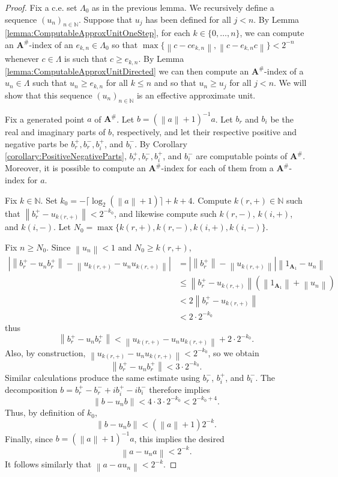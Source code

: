 \documentclass[10pt,a4paper]{amsart}
\newcommand{\abs}[1]{\left\vert #1 \right\vert}
\newcommand{\boldA}{\mathbf{A}}
\newcommand{\norm}[1]{\left\| #1 \right\|}
\begin{document}
\begin{proof}
Fix a c.e. set $\Lambda_0$ as in the previous lemma.  We recursively define a sequence $(u_n)_{n\in\mathbb{N}}$.  Suppose that $u_j$ has been defined for all $j < n$.  By Lemma \ref{lemma:ComputableApproxUnitOneStep}, for each $k \in \{0, \ldots, n\}$, we can compute an $\boldA^\#$-index of an $e_{k,n} \in \Lambda_0$ so that $\max\{\norm{c-ce_{k,n}}, \norm{c-e_{k,n}c}\} < 2^{-n}$ whenever $c \in \Lambda$ is such that $c \geq e_{k,n}$.  By Lemma \ref{lemma:ComputableApproxUnitDirected} we can then compute an $\boldA^\#$-index of a $u_n \in \Lambda$ such that $u_n \geq e_{k, n}$ for all $k \leq n$ and so that $u_n \geq u_j$ for all $j < n$.  We will show that this sequence $(u_n)_{n\in\mathbb{N}}$ is an effective approximate unit.

Fix a generated point $a$ of $\boldA^\#$.  Let $b = (\norm{a}+1)^{-1}a$.  Let $b_r$ and $b_i$ be the real and imaginary parts of $b$, respectively, and let their respective positive and negative parts be $b_r^+, b_r^-, b_i^+$, and $b_i^-$.  By Corollary \ref{corollary:PositiveNegativeParts}, $b_r^+, b_r^-, b_i^+$, and $b_i^-$ are computable points of $\boldA^\#$.  Moreover, it is possible to compute an $\boldA^\#$-index for each of them from a $\boldA^\#$-index for $a$.

Fix $k \in \mathbb{N}$.  Set $k_0 = -\lceil \log_2(\norm{a} + 1) \rceil + k + 4$.  Compute $k(r, +) \in \mathbb{N}$ such that $\norm{b_r^+-u_{k(r,+)}} < 2^{-k_0}$, and likewise compute such $k(r, -)$, $k(i, +)$, and $k(i, -)$.  Let $N_0 = \max\{k(r,+), k(r,-), k(i,+), k(i, -)\}$.

Fix $n \geq N_0$.  Since $\norm{u_n} < 1$ and $N_0 \geq k(r,+)$,
\begin{align*}
\abs{\norm{b_r^+ - u_n b_r^+} - \norm{u_{k(r,+)} - u_n u_{k(r,+)}}}
&= \abs{\norm{b_r^+} - \norm{u_{k(r,+)}}}\norm{1_{\boldA_1}-u_n} \\ &\leq \norm{b_r^+-u_{k(r,+)}}(\norm{1_{\boldA_1}}+\norm{u_n}) \\
&< 2\norm{b_r^+ - u_{k(r,+)} } \\
&< 2\cdot2^{-k_0}
\end{align*}
thus
\[\norm{b_r^+ - u_nb_r^+} < \norm{u_{k(r,+)} - u_nu_{k(r,+)}} + 2\cdot2^{-k_0}.\]
Also, by construction, $\norm{u_{k(r,+)}-u_nu_{k(r,+)}} < 2^{-k_0}$, so we obtain
\[\norm{b_r^+ - u_nb_r^+} < 3\cdot2^{-k_0}.\]
Similar calculations produce the same estimate using $b_r^-$, $b_i^+$, and $b_i^-$. The decomposition $b = b_r^+ - b_r^- + ib_i^+ - ib_i^-$
therefore implies
\[
\norm{b-u_nb} < 4\cdot3\cdot2^{-k_0} < 2^{-k_0+4}.
\]
Thus, by definition of $k_0$,
\[\norm{b-u_nb} < (\norm{a}+1)2^{-k}.\]
Finally, since $b = (\norm{a}+1)^{-1}a$, this implies the desired
\[\norm{a-u_na} < 2^{-k}.\]
It follows similarly that $\norm{a - a u_n} < 2^{-k}$.
\end{proof}
\end{document}
